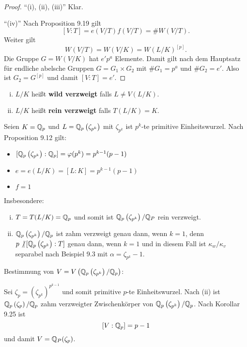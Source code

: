 \begin{proof}
	\enquote{(i), (ii), (iii)} Klar.
	
	\bigskip \enquote{(iv)} Nach Proposition 9.19 gilt
	\[ [V:T] = e(V/T)f(V/T) = \#W(V/T).
	\]
	Weiter gilt
	\[ W(V/T)=W(V/K)=W(L/K)^{[p]}.
	\]
	Die Gruppe $G=W(V/K)$ hat $e'p^a$ Elemente. Damit gilt nach dem Hauptsatz für endliche abelsche Gruppen $G=G_1 \times G_2$ mit $\# G_1 = p^a$ und $\# G_2 =e'$.
	Also ist $G_2 =G^{[p]}$ und damit $[V:T] = e'$.
\end{proof}

\begin{defi}
	\begin{enumerate}[(i)]
		\item $L/K$ heißt \textbf{wild verzweigt} falls $L \neq V(L/K)$.
		\item $L/K$ heißt \textbf{rein verzweigt} falls $T(L/K) = K$.		
	\end{enumerate}
\end{defi}

\begin{Bsp}
	Seien $K=\mathbb{Q}_p$ und $L=\mathbb{Q}_p\left( \zeta_{p^k} \right)$ mit $ \zeta_{p^k} $ ist $p^k$-te primitive Einheitswurzel. Nach Proposition 9.12 gilt:
	\begin{itemize}
		\item $[\mathbb{Q}_p\left( \zeta_{p^k} \right):\mathbb{Q}_p] = \varphi(p^k) = p^{k-1}(p-1)$
		\item $e=e(L/K)=[L:K]=p^{k-1}(p-1)$
		\item $f=1$
	\end{itemize}
	Insbesondere:
	\begin{enumerate}[(i)]
		\item $T=T(L/K)=\mathbb{Q}_p$ und somit ist $\mathbb{Q}_p\left( \zeta_{p^k} \right) / \mathbb{Q}_P$ rein verzweigt.
		\item $\mathbb{Q}_p\left( \zeta_{p^k} \right)/\mathbb{Q}_p$ ist zahm verzweigt genau dann, wenn $k = 1$,
		denn $p \not| \, [\mathbb{Q}_p\left( \zeta_{p^k} \right):T]$ genau dann, wenn $k=1$ und in diesem Fall ist $\kappa_w / \kappa_v$ separabel nach Beispiel 9.3 mit $\alpha = \zeta_{p^k} -1$.
	\end{enumerate}
	Bestimmung von $V=V \left(  \mathbb{Q}_p\left( \zeta_{p^k} \right)/\mathbb{Q}_p  \right)$:
	
	Sei $\zeta_p = \left( \zeta_{p^k} \right)^{p^{k-1}}$ und somit primitive $p$-te Einheitswurzel.
	Nach (ii) ist $\mathbb{Q}_p\left( \zeta_p \right)/\mathbb{Q}_p$ zahm verzweigter Zwischenkörper von $\mathbb{Q}_p\left( \zeta_{p^k} \right)/\mathbb{Q}_p$. Nach Korollar 9.25 ist
	\[ [V:\mathbb{Q}_p] = p-1
	\]
	und damit $V=\mathbb{Q}_P(\zeta_p)$.
\end{Bsp}


